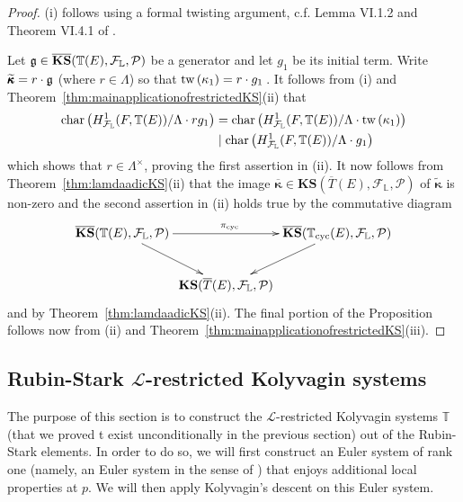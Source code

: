 \documentclass[12pt]{amsart}
\numberwithin{equation}{section}
\begin{document}
\begin{proof}
(i) follows using a formal twisting argument, c.f. Lemma VI.1.2 and  Theorem VI.4.1 of \cite{r00}.

Let $\frak{g} \in   \overline{\mathbf{KS}}({\mathbb{T}}(E),{\mathcal{F}}_{\mathbb{L}},{\mathcal{P}})$ be a generator and let $g_1$ be its initial term. Write $\widetilde{\pmb{\kappa}}=r\cdot\frak{g}$ (where $r\in {\Lambda}$) so that $\textup{tw}\left(\kappa_1\right)=r\cdot g_1$\,. It follows from (i) and Theorem~\ref{thm:mainapplicationofrestrictedKS}(ii) that 
\begin{align*}\textup{char}\left(H^1_{{\mathcal{F}}_{\mathbb{L}}}(F,{\mathbb{T}}(E))/{\Lambda}\cdot r g_1\right)&=\textup{char}\left(H^1_{{\mathcal{F}}_{\mathbb{L}}}(F,{\mathbb{T}}(E))/{\Lambda}\cdot\textup{tw}\left(\kappa_1\right)\right)\\
&\mid \textup{char}\left(H^1_{{\mathcal{F}}_{\mathbb{L}}}(F,{\mathbb{T}}(E))/{\Lambda}\cdot g_1\right)\end{align*}
which shows that $r \in {\Lambda}^\times$, proving the first assertion in (ii). It now follows from Theorem~\ref{thm:lamdaadicKS}(ii) that the image $\overline{\pmb{\kappa}} \in {\mathbf{KS}}(\overline{T}(E),{\mathcal{F}}_{\mathbb{L}},{\mathcal{P}})$ of $\widetilde{\pmb{\kappa}}$ is non-zero 
and the second assertion in (ii) holds true by the commutative diagram
$$\xymatrix@C=.05cm{\overline{\mathbf{KS}}({\mathbb{T}}(E),{\mathcal{F}}_{\mathbb{L}},{\mathcal{P}})\ar[rd] \ar[rr]^{\pi_{\textup{cyc}}}&&\overline{\mathbf{KS}}({\mathbb{T}}_{\textup{cyc}}(E),{\mathcal{F}}_{\mathbb{L}},{\mathcal{P}})\ar[ld]\\
&{\mathbf{KS}}(\overline{T}(E),{\mathcal{F}}_{\mathbb{L}},{\mathcal{P}})&
}$$
and by Theorem~\ref{thm:lamdaadicKS}(ii). The final portion of the Proposition follows now from (ii) and Theorem~\ref{thm:mainapplicationofrestrictedKS}(iii).
\end{proof}

\subsection{Rubin-Stark  ${\mathcal{L}}$-restricted Kolyvagin systems}
\label{sec:KSRS}
The purpose of this section is to construct the ${\mathcal{L}}$-restricted Kolyvagin systems ${\mathbb{T}}$ (that we proved t exist unconditionally in the previous section) out of the Rubin-Stark elements. In order to do so, we will first construct an Euler system of rank one (namely, an Euler system in the sense of \cite{r00}) that enjoys additional local properties at $p$. We will then apply Kolyvagin's descent on this Euler system.
\end{document}
